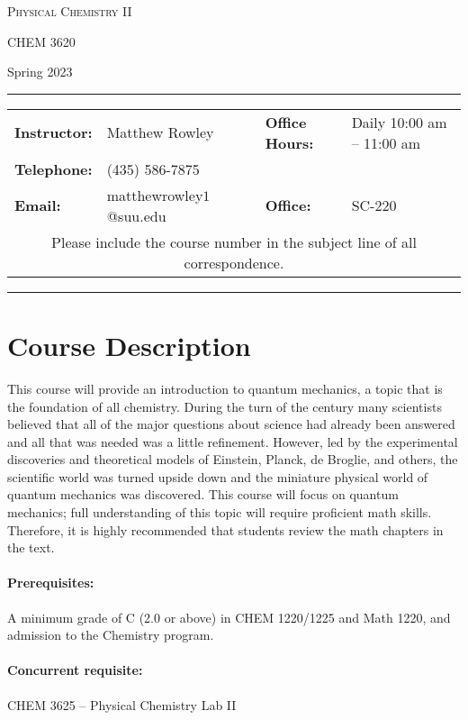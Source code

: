 \documentclass[12pt, letterpaper]{article}
\begin{document}
\begin{center}
	{\Large \textsc{Physical Chemistry II}}

	CHEM 3620
\end{center}

\begin{center}
	{\large Spring 2023}
\end{center}
\begin{center}
	\rule{0.99\textwidth}{0.4pt}
	\begin{tabular}{llcll}
		\textbf{Instructor:} & Matthew Rowley           &  & \textbf{Office Hours:} & Daily 10:00 am -- 11:00 am \\
		\textbf{Telephone:}  & (435) 586-7875           &  &                        &                            \\
		\textbf{Email:}      & matthewrowley$1$@suu.edu &  & \textbf{Office:}       & SC-220                     \\
		\multicolumn{5}{c}{Please include the course number in the subject line of all correspondence.}
	\end{tabular}
	\rule{0.99\textwidth}{0.4pt}
\end{center}


\section*{Course Description}
This course will provide an introduction to quantum mechanics, a topic that is the foundation of all chemistry. During the turn of the  century many scientists believed that all of the major questions about science had already been answered and all that was needed was a little refinement. However, led by the experimental discoveries and theoretical models of Einstein, Planck, de Broglie, and others, the scientific world was turned upside down and the miniature physical world of quantum mechanics was discovered. This course will focus on quantum mechanics; full understanding of this topic will require proficient math skills. Therefore, it is highly recommended that students review the math chapters in the text.

\paragraph{Prerequisites:}
A minimum grade of C (2.0 or above) in CHEM 1220/1225 and Math 1220, and admission to the Chemistry program.

\paragraph{Concurrent requisite:}
CHEM 3625 -- Physical Chemistry Lab II
\end{document}

